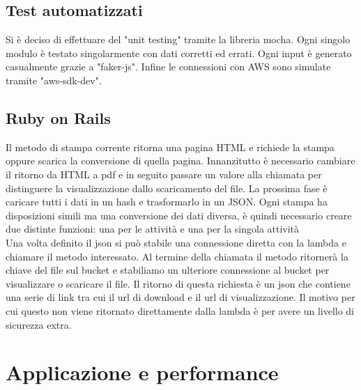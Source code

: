 \documentclass[12pt]{article}
\begin{document}
\subsection{Test automatizzati}
Si è deciso di effettuare del "unit testing" tramite la libreria mocha.
Ogni singolo modulo è testato singolarmente con dati corretti ed errati. 
Ogni input è generato casualmente grazie a "faker-js". 
Infine le connessioni con AWS sono simulate tramite "aws-sdk-dev". 

\subsection{Ruby on Rails}
Il metodo di stampa corrente ritorna una pagina HTML e richiede la stampa oppure 
scarica la conversione di quella pagina. Innanzitutto è necessario cambiare il 
ritorno da HTML a pdf e in seguito passare un valore alla chiamata per distinguere 
la visualizzazione dallo scaricamento del file. 
La prossima fase è caricare tutti i dati in un hash e trasformarlo in un JSON. 
Ogni stampa ha disposizioni simili ma una conversione dei dati diversa, è quindi 
necessario creare due distinte funzioni: una per le attività e una per la singola 
attività
\\ Una volta definito il json si può stabile una connessione diretta con la lambda e 
chiamare il metodo interessato. Al termine della chiamata il metodo ritornerà la 
chiave del file sul bucket e stabiliamo un ulteriore connessione al bucket per 
visualizzare o scaricare il file. Il ritorno di questa richiesta è un json che 
contiene una serie di link tra cui il url di download e il url di visualizzazione.
Il motivo per cui questo non viene ritornato direttamente dalla lambda è per avere 
un livello di sicurezza extra. 

\section{Applicazione e performance}
\end{document}

